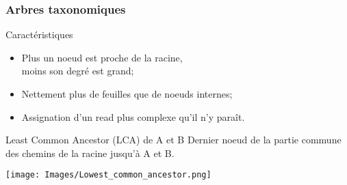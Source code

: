 \documentclass{beamer}
\begin{document}
\begin{frame}
\frametitle{Arbres taxonomiques}

\begin{block}{Caractéristiques}
\begin{itemize}
\item Plus un noeud est proche de la racine, \\moins son degré est grand;
\item Nettement plus de feuilles que de noeuds internes;
\item Assignation d'un \alert{read} plus complexe qu'il n'y paraît.
\end{itemize}
\end{block}

\end{frame}

\begin{frame}

\begin{alertblock}{Least Common Ancestor (LCA) de A et B}
Dernier noeud de la partie commune des chemins de la racine jusqu'à A et B.
\end{alertblock}

\bigskip

\begin{center}
\texttt{[image: Images/Lowest\_common\_ancestor.png]}
\end{center}

\end{frame}
\end{document}
